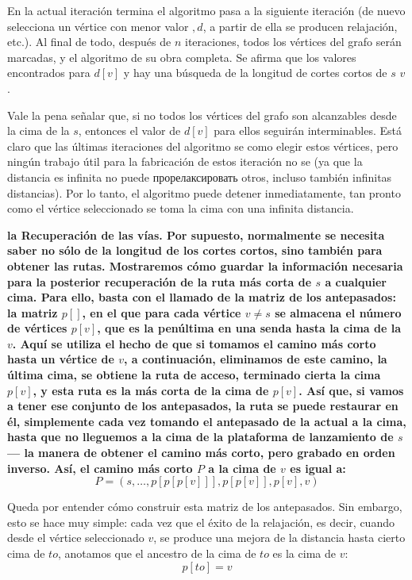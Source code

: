 En la actual iteración termina el algoritmo pasa a la siguiente iteración (de nuevo selecciona un vértice con menor valor $, d$, a partir de ella se producen relajación, etc.). Al final de todo, después de $n$ iteraciones, todos los vértices del grafo serán marcadas, y el algoritmo de su obra completa. Se afirma que los valores encontrados para $d[v]$ y hay una búsqueda de la longitud de cortes cortos de $s$ $v$.

Vale la pena señalar que, si no todos los vértices del grafo son alcanzables desde la cima de la $s$, entonces el valor de $d[v]$ para ellos seguirán interminables. Está claro que las últimas iteraciones del algoritmo se como elegir estos vértices, pero ningún trabajo útil para la fabricación de estos iteración no se (ya que la distancia es infinita no puede прорелаксировать otros, incluso también infinitas distancias). Por lo tanto, el algoritmo puede detener inmediatamente, tan pronto como el vértice seleccionado se toma la cima con una infinita distancia.

\bf{la Recuperación de las vías}. Por supuesto, normalmente se necesita saber no sólo de la longitud de los cortes cortos, sino también para obtener las rutas. Mostraremos cómo guardar la información necesaria para la posterior recuperación de la ruta más corta de $s$ a cualquier cima. Para ello, basta con el llamado \bf{de la matriz de los antepasados}: la matriz $p[]$, en el que para cada vértice $v \ne s$ se almacena el número de vértices $p[v]$, que es la penúltima en una senda hasta la cima de la $v$. Aquí se utiliza el hecho de que si tomamos el camino más corto hasta un vértice de $v$, a continuación, eliminamos de este camino, la última cima, se obtiene la ruta de acceso, terminado cierta la cima $p[v]$, y esta ruta es la más corta de la cima de $p[v]$. Así que, si vamos a tener ese conjunto de los antepasados, la ruta se puede restaurar en él, simplemente cada vez tomando el antepasado de la actual a la cima, hasta que no lleguemos a la cima de la plataforma de lanzamiento de $s$ --- la manera de obtener el camino más corto, pero grabado en orden inverso. Así, el camino más corto $P$ a la cima de $v$ es igual a:
$$ P = (s, \ldots, p[p[p[v]]], p[p[v]], p[v], v) $$

Queda por entender cómo construir esta matriz de los antepasados. Sin embargo, esto se hace muy simple: cada vez que el éxito de la relajación, es decir, cuando desde el vértice seleccionado $v$, se produce una mejora de la distancia hasta cierto cima de $to$, anotamos que el ancestro de la cima de $to$ es la cima de $v$:
$$ p[to] = v $$

